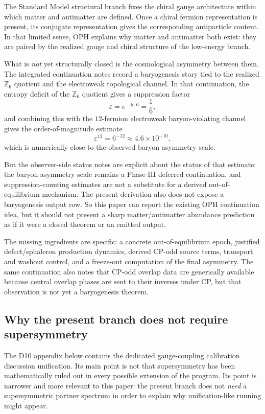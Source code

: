 \documentclass[11pt]{article}
\begin{document}
The Standard Model structural branch fixes the chiral gauge architecture within which
matter and antimatter are defined. Once a chiral fermion representation is present, its conjugate
representation gives the corresponding antiparticle content. In that limited sense, OPH explains
why matter and antimatter both exist: they are paired by the realized gauge and chiral structure
of the low-energy branch.

What is \emph{not} yet structurally closed is the cosmological asymmetry between them. The
integrated continuation notes record a baryogenesis story tied to the realized
\(\mathbb Z_6\) quotient and the electroweak topological channel. In that continuation, the
entropy deficit of the \(\mathbb Z_6\) quotient gives a suppression factor
\[
\varepsilon = e^{-\ln 6} = \frac{1}{6},
\]
and combining this with the \(12\)-fermion electroweak baryon-violating channel gives the
order-of-magnitude estimate
\[
\varepsilon^{12}=6^{-12}\approx 4.6\times 10^{-10},
\]
which is numerically close to the observed baryon asymmetry scale.

But the observer-side status notes are explicit about the status of that estimate: the baryon
asymmetry scale remains a Phase-III deferred continuation, and suppression-counting estimates are
not a substitute for a derived out-of-equilibrium mechanism. The present derivation
also does not expose a baryogenesis output row. So this paper can report the
existing OPH continuation idea, but it should not present a sharp matter/antimatter abundance
prediction as if it were a closed theorem or an emitted output.

The missing ingredients are specific: a concrete out-of-equilibrium epoch, justified
defect/sphaleron production dynamics, derived CP-odd source terms, transport and washout control,
and a freeze-out computation of the final asymmetry. The same continuation also notes that CP-odd
overlap data are generically available because central overlap phases are sent to their inverses
under CP, but that observation is not yet a baryogenesis theorem.

\subsection{Why the present branch does not require supersymmetry}

The D10 appendix below contains the dedicated gauge-coupling calibration discussion
unification. Its main point is not that supersymmetry has been mathematically ruled out in every
possible extension of the program. Its point is narrower and more relevant to this paper: the present
branch does not \emph{need} a supersymmetric partner spectrum in order to explain why
unification-like running might appear.
\end{document}
